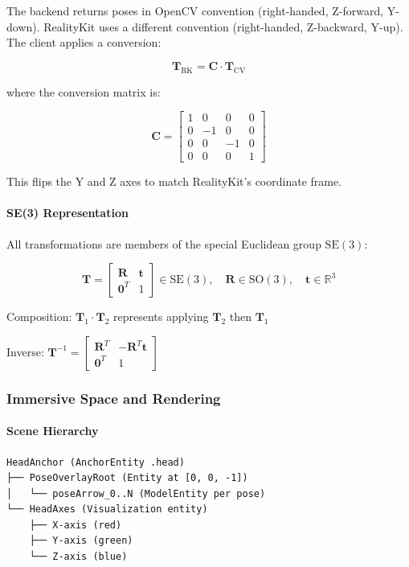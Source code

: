 The backend returns poses in OpenCV convention (right-handed, Z-forward, Y-down). RealityKit uses a different convention (right-handed, Z-backward, Y-up). The client applies a conversion:

\[
\mathbf{T}_{\text{RK}} = \mathbf{C} \cdot \mathbf{T}_{\text{CV}}
\]

where the conversion matrix is:

\[
\mathbf{C} = \begin{bmatrix}
1 & 0 & 0 & 0 \\
0 & -1 & 0 & 0 \\
0 & 0 & -1 & 0 \\
0 & 0 & 0 & 1
\end{bmatrix}
\]

This flips the Y and Z axes to match RealityKit's coordinate frame.

\paragraph{SE(3) Representation}

All transformations are members of the special Euclidean group $\text{SE}(3)$:

\[
\mathbf{T} = \begin{bmatrix}
\mathbf{R} & \mathbf{t} \\
\mathbf{0}^T & 1
\end{bmatrix} \in \text{SE}(3), \quad
\mathbf{R} \in \text{SO}(3), \quad
\mathbf{t} \in \mathbb{R}^3
\]

Composition: $\mathbf{T}_1 \cdot \mathbf{T}_2$ represents applying $\mathbf{T}_2$ then $\mathbf{T}_1$

Inverse: $\mathbf{T}^{-1} = \begin{bmatrix} \mathbf{R}^T & -\mathbf{R}^T \mathbf{t} \\ \mathbf{0}^T & 1 \end{bmatrix}$

\subsubsection{Immersive Space and Rendering}

\paragraph{Scene Hierarchy}

\begin{verbatim}
HeadAnchor (AnchorEntity .head)
├── PoseOverlayRoot (Entity at [0, 0, -1])
│   └── poseArrow_0..N (ModelEntity per pose)
└── HeadAxes (Visualization entity)
    ├── X-axis (red)
    ├── Y-axis (green)
    └── Z-axis (blue)
\end{verbatim}

